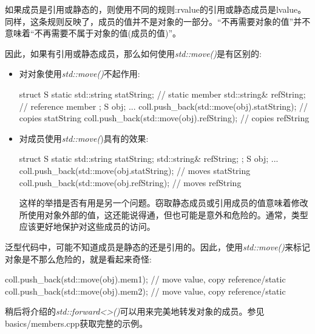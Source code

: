 如果成员是引用或静态的，则使用不同的规则:rvalue的引用或静态成员是lvalue。同样，这条规则反映了，成员的值并不是对象的一部分。“不再需要对象的值”并不意味着“不再需要不属于对象的值(成员的值)”。

因此，如果有引用或静态成员，那么如何使用\textit{std::move()}是有区别的:

\begin{itemize}
	\item 对对象使用\textit{std::move()}不起作用:

	\begin{cppcode}
struct S {
	static std::string statString; // static member
	std::string& refString; // reference member
};
S obj;
...
coll.push_back(std::move(obj).statString); // copies statString
coll.push_back(std::move(obj).refString); // copies refString
	\end{cppcode}
	\item 对成员使用\textit{std::move(})具有的效果:

	\begin{cppcode}
struct S {
	static std::string statString;
	std::string& refString;
};
S obj;
...
coll.push_back(std::move(obj.statString); // moves statString
coll.push_back(std::move(obj.refString); // moves refString
	\end{cppcode}
	这样的举措是否有用是另一个问题。窃取静态成员或引用成员的值意味着修改所使用对象外部的值，这还能说得通，但也可能是意外和危险的。通常，类型应该更好地保护对这些成员的访问。

\end{itemize}

泛型代码中，可能不知道成员是静态的还是引用的。因此，使用\textit{std::move()}来标记对象是不那么危险的，就是看起来奇怪:

\begin{cppcode}
coll.push_back(std::move(obj).mem1); // move value, copy reference/static
coll.push_back(std::move(obj).mem2); // move value, copy reference/static
\end{cppcode}

稍后将介绍的\textit{std::forward<>()}可以用来完美地转发对象的成员。参见basics/members.cpp获取完整的示例。
























